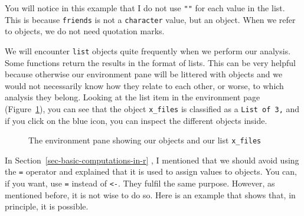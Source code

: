 \documentclass[
  letterpaper,
  DIV=11,
  numbers=noendperiod]{scrreprt}
\begin{document}
You will notice in this example that I do not use \texttt{""} for each
value in the list. This is because \texttt{friends} is not a
\texttt{character} value, but an object. When we refer to objects, we do
not need quotation marks.

We will encounter \texttt{list} objects quite frequently when we perform
our analysis. Some functions return the results in the format of lists.
This can be very helpful because otherwise our environment pane will be
littered with objects and we would not necessarily know how they relate
to each other, or worse, to which analysis they belong. Looking at the
list item in the environment page (Figure~\ref{fig-img-x-files}), you
can see that the object \texttt{x\_files} is classified as a
\texttt{List\ of\ 3,} and if you click on the blue icon, you can inspect
the different objects inside.

\begin{figure}


\caption{\label{fig-img-x-files}The environment pane showing our objects
and our list \texttt{x\_files}}

\end{figure}%

In Section~\ref{sec-basic-computations-in-r} , I mentioned that we
should avoid using the \texttt{=} operator and explained that it is used
to assign values to objects. You can, if you want, use \texttt{=}
instead of \texttt{\textless{}-}. They fulfil the same purpose. However,
as mentioned before, it is not wise to do so. Here is an example that
shows that, in principle, it is possible.
\end{document}
